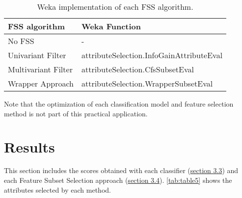 \documentclass[a4paper,11pt]{article}
\begin{document}
\begin{table}[h]
\centering
\begin{tabular}{||l|l||}
	\hline
	FSS algorithm & Weka Function\\
	\hline
	No FSS & -\\
	Univariant Filter & attributeSelection.InfoGainAttributeEval\\
	Multivariant Filter & attributeSelection.CfsSubsetEval\\
	Wrapper Approach & attributeSelection.WrapperSubsetEval\\
	\hline
\end{tabular}
\caption{Weka implementation of each FSS algorithm.}
\label{tab:table4}
\end{table}

Note that the optimization of each classification model and feature selection method is not part of this practical application.

\section{Results}
\label{sec:results}

This section includes the scores obtained with each classifier (\hyperref[subsec:algorithms]{section 3.3}) and each Feature Subset Selection approach (\hyperref[subsec:fss]{section 3.4}). \autoref{tab:table5} shows the attributes selected by each method.
\end{document}
